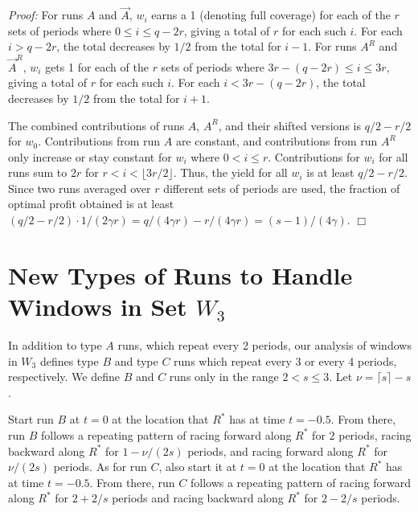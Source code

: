 \documentclass[11pt]{article}
\newcommand\QED{\ifhmode\allowbreak\else\nobreak\fi
\quad\nobreak$\Box$\medbreak}
\newcommand{\proofstart}{\par\noindent \emph{Proof:} }
\newcommand{\proofend}{\QED\par}
\newenvironment{proof}{\proofstart}{\proofend}
\begin{document}
\begin{proof}
For runs $A$ and $\vec{A}$, $w_i$ earns a 1 (denoting full coverage) for each of the $r$ sets of periods where $0 \leq i \leq q - 2r$, giving a total of $r$ for each such $i$.  For each $i > q - 2r$, the total decreases by $1/2$ from the total for $i - 1$.   For runs $A^R$ and $\vec{A}^R$, $w_i$ gets 1 for each of the $r$ sets of periods where $3r - (q - 2r) \leq i \leq 3r$, giving a total of $r$ for each such $i$.  For each $i < 3r - (q - 2r)$, the total decreases by $1/2$ from the total for $i + 1$.

The combined contributions of runs $A$, $A^R$, and their shifted versions is $q/2 - r/2$ for $w_0$.  Contributions from run $A$ are constant, and contributions from run $A^R$ only increase or stay constant for $w_i$ where $0 < i \leq r$.  Contributions for $w_i$ for all runs sum to $2r$ for $r < i < \lfloor 3r/2 \rfloor$.  Thus, the yield for all $w_i$ is at least $q/2 - r/2$.  Since two runs averaged over $r$ different sets of periods are used, the fraction of optimal profit obtained is at least $(q/2 - r/2)\cdot 1/(2\gamma r) = q/(4\gamma r) - r/(4\gamma r) = (s - 1)/(4\gamma)$.
\end{proof}


\section{New Types of Runs to Handle Windows in Set $W_3$}
\label{section:runs for W_3}

In addition to type $A$ runs, which repeat every 2 periods, our analysis of windows in $W_3$ defines type $B$ and type $C$ runs which repeat every 3 or every 4 periods, respectively.  We define $B$ and $C$ runs only in the range $2 < s \leq 3$.  Let $\nu = \lceil s \rceil - s$.

Start run $B$ at $t = 0$ at the location that $R^*$ has at time $t = -0.5$.  From there, run $B$ follows a repeating pattern of racing forward along $R^*$ for $2$ periods, racing backward along $R^*$ for $1 - \nu/(2s)$ periods, and racing forward along $R^*$ for $\nu/(2s)$ periods.  As for run $C$, also start it at $t = 0$ at the location that $R^*$ has at time $t = -0.5$.  From there, run $C$ follows a repeating pattern of racing forward along $R^*$ for $2 + 2/s$ periods and racing backward along $R^*$ for $2 - 2/s$ periods.
\end{document}
